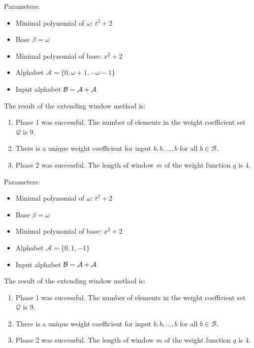 \begin{exmp}
\label{ex:AC}

Parameters:
\begin{itemize}
    \item Minimal polynomial of $\omega$: $t^2 + 2$
    \item Base $\beta= \omega $
    \item Minimal polynomial of base: $x^2 + 2$
    \item Alphabet $\mathcal{A} = \{0, \omega + 1, -\omega - 1\} $
    \item Input alphabet $\mathcal{B} =\mathcal{A}+\mathcal{A}$
\end{itemize}

The result of the extending window method is:
\begin{enumerate}
    \item Phase 1 was successful.
The number of elements in the weight coefficient set $\mathcal{Q}$ is $ 9 $.

    \item There is a unique weight coefficient for input $b,b,\dots,b$ for all $b\in\mathcal{B}$.

    \item Phase 2 was successful.
The length of window $m$ of the weight function $q$ is  $ 4 $.
\end{enumerate}
\end{exmp}
\begin{exmp}
\label{ex:AD}

Parameters:
\begin{itemize}
    \item Minimal polynomial of $\omega$: $t^2 + 2$
    \item Base $\beta= \omega $
    \item Minimal polynomial of base: $x^2 + 2$
    \item Alphabet $\mathcal{A} = \{0, 1, -1\} $
    \item Input alphabet $\mathcal{B} =\mathcal{A}+\mathcal{A}$
\end{itemize}

The result of the extending window method is:
\begin{enumerate}
    \item Phase 1 was successful.
The number of elements in the weight coefficient set $\mathcal{Q}$ is $ 9 $.

    \item There is a unique weight coefficient for input $b,b,\dots,b$ for all $b\in\mathcal{B}$.

    \item Phase 2 was successful.
The length of window $m$ of the weight function $q$ is  $ 4 $.
\end{enumerate}
\end{exmp}